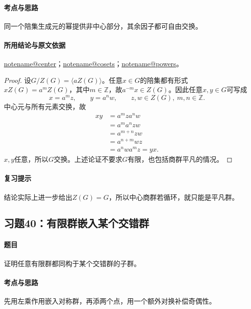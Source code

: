 \documentclass[UTF8,a4paper,11pt,fontset=windows]{ctexart}
\makeatletter
\newcommand{\Z}{\mathbb Z}\newcommand{\Q}{\mathbb Q}
\newcommand{\noteref}[1]{\hyperref[note:#1]{\csname notename@#1\endcsname}}
\newcommand{\exref}[2]{\hyperref[ex:#1:#2]{第#1章习题#2}}
\makeatother
\begin{document}
\paragraph{考点与思路}
同一个陪集生成元的幂提供非中心部分，其余因子都可自由交换。

\paragraph{所用结论与原文依据}
\noteref{center}；\noteref{cosets}；\noteref{powers}。


\begin{proof}
设$G/Z(G)=\langle aZ(G)\rangle$。任意$x\in G$的陪集都有形式$xZ(G)=a^mZ(G)$，其中$m\in\Z$，故$a^{-m}x\in Z(G)$。因此任意$x,y\in G$可写成
\[
x=a^mz,\qquad y=a^nw,
\qquad z,w\in Z(G),\ m,n\in\Z.
\]
中心元与所有元素交换，故
\begin{align*}
xy&=a^mza^nw\\
&=a^ma^nzw\\
&=a^{m+n}zw\\
&=a^{n+m}wz\\
&=a^nwa^mz=yx.
\end{align*}
$x,y$任意，所以$G$交换。上述论证不要求$G$有限，也包括商群平凡的情况。
\end{proof}

\paragraph{复习提示}
结论实际上进一步给出$Z(G)=G$，所以中心商群若循环，就只能是平凡群。


\subsection{习题40：\texorpdfstring{有限群嵌入某个交错群}{有限群嵌入某个交错群}}
\label{ex:2:40}

\paragraph{题目}
证明任意有限群都同构于某个交错群的子群。

\paragraph{考点与思路}
先用左乘作用嵌入对称群，再添两个点，用一个额外对换补偿奇偶性。
\end{document}
